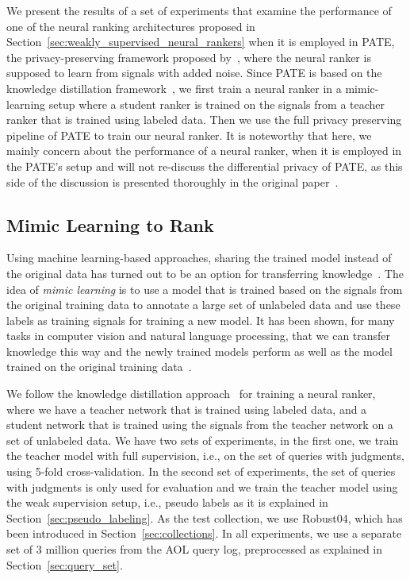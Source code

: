 We present the results of a set of experiments that examine the performance of one of the neural ranking architectures proposed in Section~\ref{sec:weakly_supervised_neural_rankers} when it is employed in PATE, the privacy-preserving framework proposed by~\citet{Papernot:2017}, where the neural ranker is supposed to learn from signals with added noise. 
Since PATE is based on the knowledge distillation framework~\cite{Hinton:2015}, we first train a neural ranker in a mimic-learning setup where a student ranker is trained on the signals from a teacher ranker that is trained using labeled data. Then we use the full privacy preserving pipeline of PATE to train our neural ranker.
%
It is noteworthy that here, we mainly concern about the performance of a neural ranker, when it is employed in the PATE's setup and will not re-discuss the differential privacy of PATE, as this side of the discussion is presented thoroughly in the original paper~\citep{Papernot:2017}.

\subsection{Mimic Learning to Rank}
\label{sec:mimic_learning_to_rank}
Using machine learning-based approaches, sharing the trained model instead of the original data has turned out to be an option for transferring knowledge~\citep{Papernot:2017,Shokri:2015,Abadi:2016}. 
The idea of \emph{mimic learning} is to use a model that is trained based on the signals from the original training data to annotate a large set of unlabeled data and use these labels as training signals for training a new model. 
It has been shown, for many tasks in computer vision and natural language processing, that we can transfer knowledge this way and the newly trained models perform as well as the model trained on the original training data~\citep{Bucilua:2006,Hinton:2015,Romero:2014,Ba:2014}.

We follow the knowledge distillation approach~\cite{Hinton:2015} for training a neural ranker, where we have a teacher network that is trained using labeled data, and a student network that is trained using the signals from the teacher network on a set of unlabeled data. We have two sets of experiments, in the first one, we train the teacher model with full supervision, i.e., on the set of queries with judgments, using 5-fold cross-validation. 
In the second set of experiments, the set of queries with judgments is only used for evaluation and we train the teacher model using the weak supervision setup, i.e., pseudo labels as it is explained in Section~\ref{sec:pseudo_labeling}. 
As the test collection, we use Robust04, which has been introduced in Section~\ref{sec:collections}. In all experiments, we use a separate set of $3$ million queries from the AOL query log, preprocessed as explained in Section~\ref{sec:query_set}.

